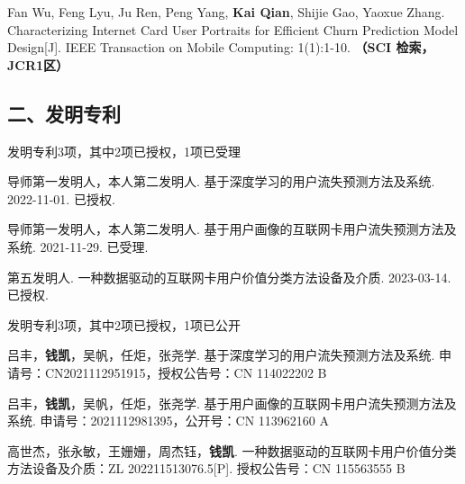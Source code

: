 \else
\begin{enumerate}[label={[\arabic*]},itemindent=2em,wide]
	\item Fan Wu, Feng Lyu, Ju Ren, Peng Yang, \textbf{Kai Qian}, Shijie Gao, Yaoxue Zhang. Characterizing Internet Card User Portraits for Efficient Churn Prediction Model Design[J]. IEEE Transaction on Mobile Computing: 1(1):1-10. {\bfseries \heiti（SCI 检索，JCR1区）}
\end{enumerate}
\fi

\vspace{22pt}
\subsection*{二、发明专利}
\ifblindreview
发明专利3项，其中2项已授权，1项已受理
\begin{enumerate}[label={[\arabic*]},itemindent=2em,wide]
	\item 导师第一发明人，本人第二发明人. 基于深度学习的用户流失预测方法及系统. 2022-11-01. 已授权.
	\item 导师第一发明人，本人第二发明人. 基于用户画像的互联网卡用户流失预测方法及系统. 2021-11-29. 已受理.
	\item 第五发明人. 一种数据驱动的互联网卡用户价值分类方法设备及介质. 2023-03-14. 已授权.
\end{enumerate}
\else
发明专利3项，其中2项已授权，1项已公开
\begin{enumerate}[label={[\arabic*]},itemindent=2em,wide]
	\item 吕丰，\textbf{钱凯}，吴帆，任炬，张尧学. 基于深度学习的用户流失预测方法及系统. 申请号：CN2021112951915，授权公告号：CN 114022202 B
	\item 吕丰，\textbf{钱凯}，吴帆，任炬，张尧学. 基于用户画像的互联网卡用户流失预测方法及系统. 申请号：2021112981395，公开号：CN 113962160 A
	\item 高世杰，张永敏，王姗姗，周杰钰，\textbf{钱凯}. 一种数据驱动的互联网卡用户价值分类方法设备及介质：ZL 202211513076.5[P]. 授权公告号：CN 115563555 B
\end{enumerate}
\fi

\ifblindreview
\else

